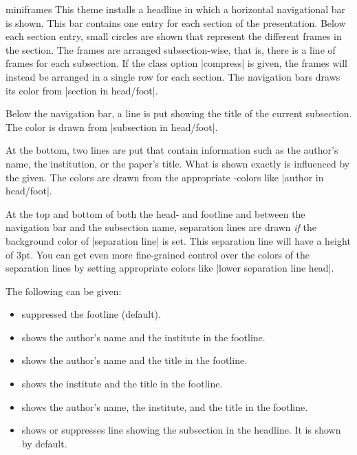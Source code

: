 \begin{outerthemeexample}{miniframes}
  This theme installs a headline in which a horizontal navigational
  bar is shown. This bar contains one entry for each section of the
  presentation. Below each section entry, small circles are shown that
  represent the different frames in the section. The frames are
  arranged subsection-wise, that is, there is a line of frames for
  each subsection. If the class  option |compress| is given, the
  frames will instead be arranged in a single row for each
  section. The navigation bars draws its color from
  |section in head/foot|.

  Below the navigation bar, a line is put showing the title of the
  current subsection. The color is drawn from |subsection in head/foot|.

  At the bottom, two lines are put that contain information such as
  the author's name, the institution, or the paper's title. What is
  shown exactly is influenced by the  given. The colors
  are drawn from the appropriate \beamer-colors like
  |author in head/foot|.

  At the top and bottom of both the head- and footline and between the
  navigation bar and the subsection name, separation lines are drawn
  \emph{if} the background color of |separation line| is set. This
  separation line will have a height of 3pt. You can get even more
  fine-grained control over the colors of the separation lines by
  setting appropriate colors like |lower separation line head|.

  The following  can be given:
  \begin{itemize}
  \item {} suppressed the footline (default).
  \item {} shows the author's name
    and the institute in the footline.
  \item {} shows the author's name
    and the title in the footline.
  \item {} shows the institute
    and the title in the footline.
  \item {} shows the author's
    name, the institute, and the title in the footline.
  \item {} shows or suppresses
    line showing the subsection in the headline. It is shown by
    default.
  \end{itemize}
\end{outerthemeexample}

